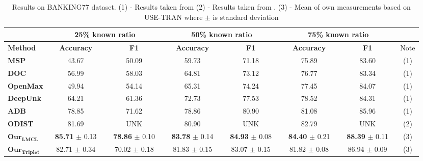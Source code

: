 \documentclass[runningheads]{llncs}
\begin{document}
\begin{table}[t]
\caption{Results on BANKING77 dataset. (1) - Results taken from \cite{zhang2021adaptive_decision_boundary} (2) - Results taken from \cite{odist}. (3) - Mean of own measurements based on USE-TRAN where $\pm$ is standard deviation}
\label{tab:banking_result}
\centering
\begin{adjustbox}{width=1\textwidth}
\begin{tabular}{l|cc|cc|cc|c}
                            & \multicolumn{2}{c|}{25\% known ratio}       & \multicolumn{2}{c|}{50\% known ratio}       & \multicolumn{2}{c|}{75\% known ratio}       &      \\ \hline
\textbf{Method}             & \textbf{Accuracy}    & \textbf{F1}          & \textbf{Accuracy}    & \textbf{F1}          & \textbf{Accuracy}    & \textbf{F1}          & Note \\ \hline
\textbf{MSP}                & 43.67                & 50.09                & 59.73                & 71.18                & 75.89                & 83.60                & (1)  \\
\textbf{DOC}                & 56.99                & 58.03                & 64.81                & 73.12                & 76.77                & 83.34                & (1)  \\
\textbf{OpenMax}            & 49.94                & 54.14                & 65.31                & 74.24                & 77.45                & 84.07                & (1)  \\
\textbf{DeepUnk}            & 64.21                & 61.36                & 72.73                & 77.53                & 78.52                & 84.31                & (1)  \\
\textbf{ADB}                & 78.85                & 71.62                & 78.86                & 80.90                & 81.08                & 85.96                & (1)  \\
\textbf{ODIST}              & 81.69                &      UNK                 & 80.90                &              UNK        & 82.79                &                 UNK     & (2)  \\ \hline
$\mathbf{Our}_\mathbf{LMCL}$    & \,\,  \textbf{85.71} $\pm$ 0.13 \,\, &\,\,   \textbf{78.86} $\pm$ 0.10 \,\,  & \,\,  \textbf{83.78} $\pm$  0.14 \,\, & \,\,  \textbf{84.93} $\pm$  0.08 \,\, & \,\,  \textbf{84.40} $\pm$  0.21 \,\, & \,\,    \textbf{88.39} $\pm$  0.11 \,\, & (3)  \\
$\mathbf{Our}_\mathbf{Triplet}$ & \,\,  82.71 $\pm$  0.34 \,\, & \,\, 70.02  $\pm$  0.18 \,\, & \,\,  81.83 $\pm$  0.15 \,\,  & \,\,    83.07 $\pm$  0.15 \,\, & \,\,   81.82 $\pm$  0.08 \,\,  & \,\,   86.94 $\pm$  0.09 \,\, & (3) 
\end{tabular}
\end{adjustbox}
\end{table}
\end{document}
